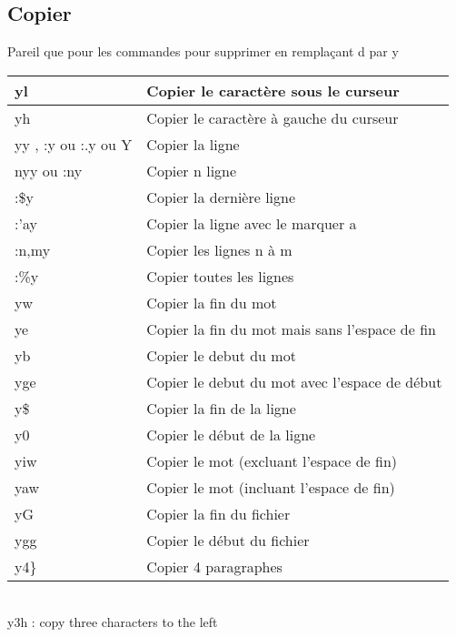 \documentclass{article}
\begin{document}
\subsection{Copier}
Pareil que pour les commandes pour supprimer en remplaçant d par y\\


\begin{tabular}{|p{3cm}| l|  }\hline
yl & Copier le caractère sous le curseur \\ \hline
yh & Copier le caractère à gauche du curseur \\ \hline
yy , :y ou :.y ou Y & Copier la ligne \\ \hline
nyy ou :ny & Copier n ligne \\ \hline
:\$y & Copier la dernière ligne \\ \hline
:'ay & Copier la ligne avec le marquer a \\ \hline
:n,my & Copier les lignes n à m \\ \hline
:\%y & Copier toutes les lignes \\ \hline
yw & Copier la fin du mot \\ \hline
ye & Copier la fin du mot mais sans l'espace de fin\\ \hline
yb & Copier le debut du mot\\ \hline
yge & Copier le debut du mot avec l'espace de début\\ \hline
y\$ & Copier la fin de la ligne \\ \hline
y0 & Copier le début de la ligne \\ \hline
yiw & Copier le mot (excluant l'espace de fin)\\ \hline
yaw & Copier le mot (incluant l'espace de fin)\\ \hline
yG & Copier la fin du fichier\\ \hline
ygg & Copier le début du fichier\\ \hline
y4\} & Copier 4 paragraphes\\ \hline
\end{tabular}\\
y3h :  copy three characters to the left
\end{document}
